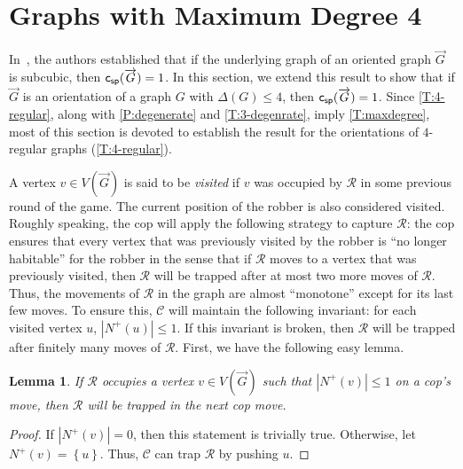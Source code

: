 \documentclass[a4paper,12pt]{amsart}
\newtheorem{lemma}[theorem]{Lemma}
\newcommand{\set}[1]{\left\{#1\right\}}
\newcommand{\R}{\mathcal{R}}
\newcommand{\C}{\mathcal{C}}
\newcommand{\csp}[1]{{\sf c_{sp}}(\overrightarrow{#1})}
\let\leq\leqslant
\begin{document}
\section{Graphs with Maximum Degree 4}\label{S:maxdeg}
In~\cite{das2023cops}, the authors established that if the underlying graph of an oriented graph $\overrightarrow{G}$ is subcubic, then $\csp{G} = 1$. In this section, we extend this result to show that if $\overrightarrow{G}$ is an orientation of a graph $G$ with $\Delta(G) \leq 4$, then $\csp{G} = 1$. Since \cref{T:4-regular}, along with \cref{P:degenerate} and \cref{T:3-degenrate}, imply \cref{T:maxdegree}, most of this section is devoted to establish the result for the orientations of $4$-regular graphs (\cref{T:4-regular}).  

A vertex $v \in V(\overrightarrow{G})$ is said to be \textit{visited} if $v$ was occupied by $\R$ in some previous round of the game. The current position of the robber is also considered visited.    Roughly speaking, the cop will apply the following strategy to capture $\R$:  the cop ensures that every vertex that was previously visited by the robber is ``no longer habitable'' for the robber in the sense that if $\R$ moves to a vertex that was previously visited, then $\R$ will be trapped after at most two more moves of $\R$. Thus, the movements of $\R$ in the graph are almost ``monotone'' except for its last few moves. To ensure this, $\C$ will maintain the following invariant: for each visited vertex $u$, $|N^+(u)| \leq 1$. If this invariant is broken, then $\R$ will be trapped after finitely many moves of $\R$. First, we have the following easy lemma. 
\begin{lemma}\label{L:trivial}
    If $\R$ occupies a vertex $v\in V(\overrightarrow{G})$ such that $|N^+(v)| \leq 1$ on a cop's move, then $\R$ will be trapped in the next cop move.
\end{lemma}
\begin{proof}
    If $|N^+(v)| = 0$, then this statement is trivially true. Otherwise, let $N^+(v) = \set{u}$. Thus, $\C$ can trap $\R$ by pushing $u$.
\end{proof}
\end{document}
